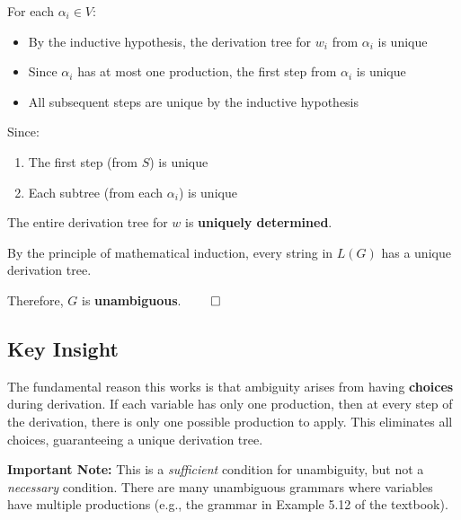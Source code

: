 \documentclass[12pt]{article}
\begin{document}
For each $\alpha_i \in V$:
\begin{itemize}
\item By the inductive hypothesis, the derivation tree for $w_i$ from $\alpha_i$ is unique
\item Since $\alpha_i$ has at most one production, the first step from $\alpha_i$ is unique
\item All subsequent steps are unique by the inductive hypothesis
\end{itemize}

Since:
\begin{enumerate}
\item The first step (from $S$) is unique
\item Each subtree (from each $\alpha_i$) is unique
\end{enumerate}

The entire derivation tree for $w$ is \textbf{uniquely determined}.

By the principle of mathematical induction, every string in $L(G)$ has a unique derivation tree.

Therefore, $G$ is \textbf{unambiguous}. $\qed$

\subsection{Key Insight}

The fundamental reason this works is that ambiguity arises from having \textbf{choices} during derivation. If each variable has only one production, then at every step of the derivation, there is only one possible production to apply. This eliminates all choices, guaranteeing a unique derivation tree.

\textbf{Important Note:} This is a \textit{sufficient} condition for unambiguity, but not a \textit{necessary} condition. There are many unambiguous grammars where variables have multiple productions (e.g., the grammar in Example 5.12 of the textbook).
\end{document}
